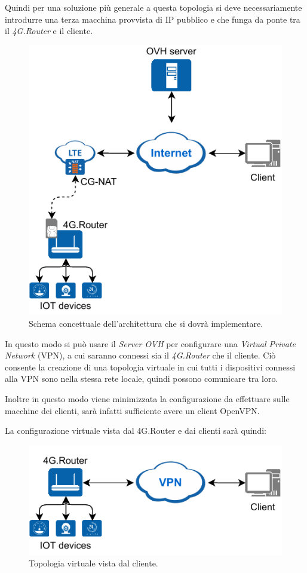 Quindi per una soluzione più generale a questa topologia si deve necessariamente introdurre una terza macchina provvista di IP pubblico e che funga da ponte tra il \textit{4G.Router} e il cliente.


\begin{figure}[H]
	\centering
	\includegraphics[width=0.5\linewidth]{immagini/diag-real}
	\caption{Schema concettuale dell'architettura che si dovrà implementare.}
	\label{fig:schem_architettura_reale}
\end{figure}

In questo modo si può usare il \textit{Server OVH} per configurare una \textit{Virtual Private Network} (VPN), a cui saranno connessi sia il \textit{4G.Router} che il cliente. Ciò consente la creazione di una topologia virtuale in cui tutti i dispositivi connessi alla VPN sono nella stessa rete locale, quindi possono comunicare tra loro.

Inoltre in questo modo viene minimizzata la configurazione da effettuare sulle macchine dei clienti, sarà infatti sufficiente avere un client OpenVPN.

La configurazione virtuale vista dal 4G.Router e dai clienti sarà quindi:

\begin{figure}[H]
	\centering
	\includegraphics[width=0.5\linewidth]{immagini/diag-virtual}
	\caption{Topologia virtuale vista dal cliente.}
	\label{fig:schema_architettura_virtuale}
\end{figure}

\newpage
